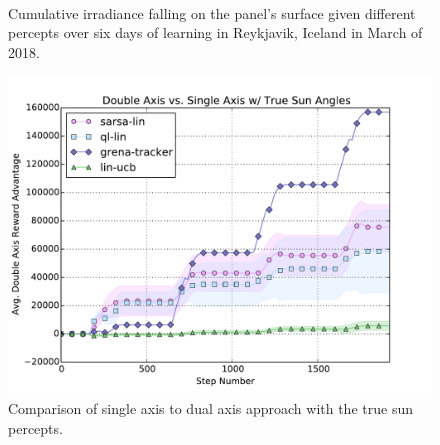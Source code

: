\documentclass{article}
\begin{document}
{\begin{figure}
\begin{center}
	 \\ %
\caption{Cumulative irradiance falling on the panel's surface given different percepts over six days of learning in Reykjavik, Iceland in March of 2018.}
\label{fig:results_ice}
\end{center}
\end{figure}




\begin{figure}
\begin{center}
\includegraphics[scale=0.26]{figures/saxis_vs_daxis_true}
\caption{Comparison of single axis to dual axis approach with the true sun percepts.}
\label{fig:results_axis}
\end{center}
\end{figure}


}
\end{document}
